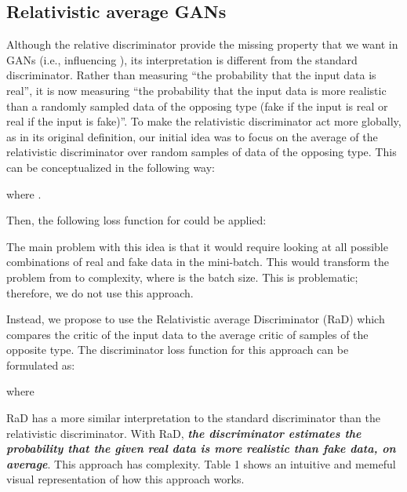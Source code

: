 \documentclass{article}
\begin{document}
\subsection{Relativistic average GANs}

Although the relative discriminator provide the missing property that we want in GANs (i.e.,  influencing ), its interpretation is different from the standard discriminator. Rather than measuring “the probability that the input data is real”, it is now measuring “the probability that the input data is more realistic than a randomly sampled data of the opposing type (fake if the input is real or real if the input is fake)”. To make the relativistic discriminator act more globally, as in its original definition, our initial idea was to focus on the average of the relativistic discriminator over random samples of data of the opposing type. This can be conceptualized in the following way:


where .

Then, the following loss function for  could be applied:

The main problem with this idea is that it would require looking at all possible combinations of real and fake data in the mini-batch. This would transform the problem from  to  complexity, where  is the batch size. This is problematic; therefore, we do not use this approach.

Instead, we propose to use the Relativistic average Discriminator (RaD) which compares the critic of the input data to the average critic of samples of the opposite type. The discriminator loss function for this approach can be formulated as: 

where

RaD has a more similar interpretation to the standard discriminator than the relativistic discriminator. With RaD, \textbf{\textit{the discriminator estimates the probability that the given real data is more realistic than fake data, on average}}. This approach has  complexity. Table 1 shows an intuitive and memeful visual representation of how this approach works. 
\end{document}
